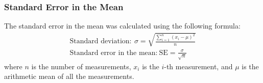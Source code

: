 \subsubsection*{Standard Error in the Mean} \label{subsubsection: standard error in the mean}
The standard error in the mean was calculated using the following formula:
\begin{gather}
    \text{Standard deviation}:~\sigma = \sqrt{\frac{\sum_{i=1}^{n}(x_i - \mu)^2}{n}} \\
    \text{Standard error in the mean:}~\text{SE} = \frac{\sigma}{\sqrt{n}}
\end{gather}
where $n$ is the number of measurements, $x_i$ is the $i$-th measurement, and $\mu$ is the arithmetic mean of all the measurements.


\printnoidxglossaries